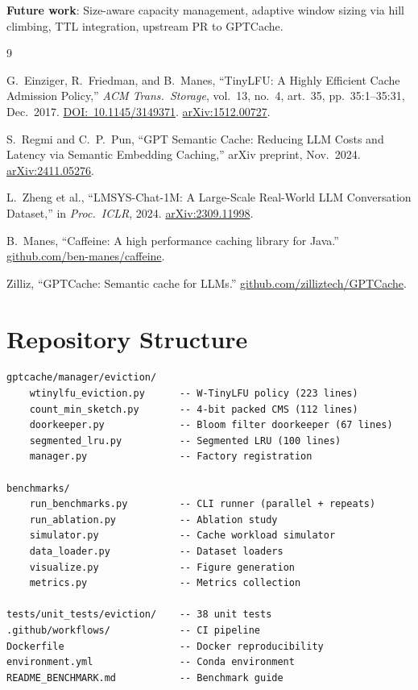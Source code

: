 \documentclass[11pt,a4paper]{article}
\begin{document}
\textbf{Future work}: Size-aware capacity management, adaptive window sizing via hill climbing, TTL integration, upstream PR to GPTCache.

\begin{thebibliography}{9}

 G.~Einziger, R.~Friedman, and B.~Manes, ``TinyLFU: A Highly Efficient Cache Admission Policy,'' \textit{ACM Trans.\ Storage}, vol.~13, no.~4, art.~35, pp.~35:1--35:31, Dec.\ 2017. \href{https://doi.org/10.1145/3149371}{DOI:~10.1145/3149371}. \href{https://arxiv.org/abs/1512.00727}{arXiv:1512.00727}.

 S.~Regmi and C.~P.~Pun, ``GPT Semantic Cache: Reducing LLM Costs and Latency via Semantic Embedding Caching,'' arXiv preprint, Nov.\ 2024. \href{https://arxiv.org/abs/2411.05276}{arXiv:2411.05276}.

 L.~Zheng et al., ``LMSYS-Chat-1M: A Large-Scale Real-World LLM Conversation Dataset,'' in \textit{Proc.\ ICLR}, 2024. \href{https://arxiv.org/abs/2309.11998}{arXiv:2309.11998}.

 B.~Manes, ``Caffeine: A high performance caching library for Java.'' \href{https://github.com/ben-manes/caffeine}{github.com/ben-manes/caffeine}.

 Zilliz, ``GPTCache: Semantic cache for LLMs.'' \href{https://github.com/zilliztech/GPTCache}{github.com/zilliztech/GPTCache}.

\end{thebibliography}

\appendix
\section{Repository Structure}

\begin{lstlisting}
gptcache/manager/eviction/
    wtinylfu_eviction.py      -- W-TinyLFU policy (223 lines)
    count_min_sketch.py       -- 4-bit packed CMS (112 lines)
    doorkeeper.py             -- Bloom filter doorkeeper (67 lines)
    segmented_lru.py          -- Segmented LRU (100 lines)
    manager.py                -- Factory registration

benchmarks/
    run_benchmarks.py         -- CLI runner (parallel + repeats)
    run_ablation.py           -- Ablation study
    simulator.py              -- Cache workload simulator
    data_loader.py            -- Dataset loaders
    visualize.py              -- Figure generation
    metrics.py                -- Metrics collection

tests/unit_tests/eviction/    -- 38 unit tests
.github/workflows/            -- CI pipeline
Dockerfile                    -- Docker reproducibility
environment.yml               -- Conda environment
README_BENCHMARK.md           -- Benchmark guide
\end{lstlisting}
\end{document}
